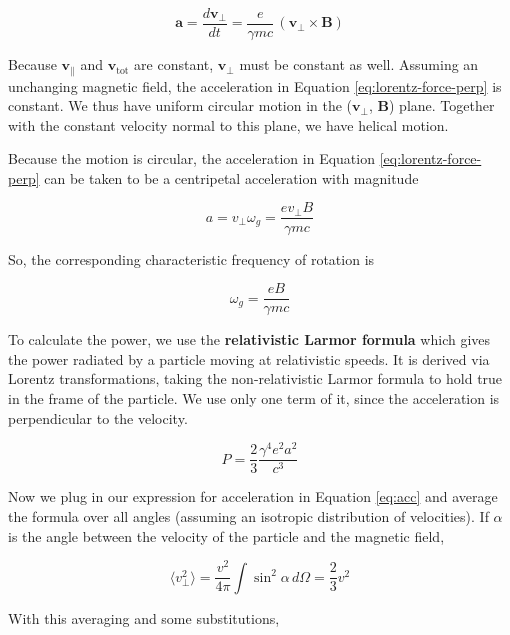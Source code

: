 \documentclass[12pt, letterpaper, preprint]{aastex}
\newcommand{\vel}{\textbf{v}}
\newcommand{\bfield}{\textbf{B}}
\newcommand{\acc}{\textbf{a}}
\begin{document}
\begin{enumerate}
\begin{equation}
  \acc = \frac{d \vel_\bot}{dt} = \frac{e}{\gamma m c} \, (\vel_\bot \times \mathbf{B})
  \label{eq:lorentz-force-perp}
\end{equation}

Because $\vel_\parallel$ and $\vel_\mathrm{tot}$ are constant,
$\vel_\bot$ must be constant as well. Assuming an unchanging magnetic field, the acceleration in Equation \ref{eq:lorentz-force-perp} is constant. We thus have uniform circular motion in the ($\vel_\bot$, \bfield) plane. Together with the constant velocity normal to this plane, we have helical motion.

Because the motion is circular, the acceleration in Equation \ref{eq:lorentz-force-perp} can be taken to be a centripetal acceleration
with magnitude

\begin{equation}
a = v_\bot \omega_g = \frac{e v_\bot B}{\gamma m c}
\label{eq:acc}
\end{equation}

So, the corresponding characteristic frequency of rotation is

\begin{equation}
\omega_g = \frac{e B}{\gamma m c}
\end{equation}

To calculate the power, we use the \textbf{relativistic Larmor formula}
which gives the power radiated by a particle moving at relativistic speeds. It is derived via Lorentz transformations, taking the non-relativistic Larmor formula to hold true in the frame of the particle.
We use only one term of it, since the acceleration is perpendicular to the velocity.

\begin{equation}
  P = \frac{2}{3} \frac{\gamma^4 e^2 a^2}{c^3}
  \label{rel-larmor-formula}
\end{equation}

Now we plug in our expression for acceleration in Equation \ref{eq:acc} and average the formula over all angles (assuming an isotropic distribution of velocities). If $\alpha$ is the angle between the velocity of the particle and the magnetic field, 

\begin{equation}
\langle v_\bot^2 \rangle = \frac{v^2}{4 \pi} \int \sin^2 \alpha \, d\Omega
= \frac{2}{3} v^2
\end{equation}

With this averaging and some substitutions,


\end{enumerate}
\end{document}
